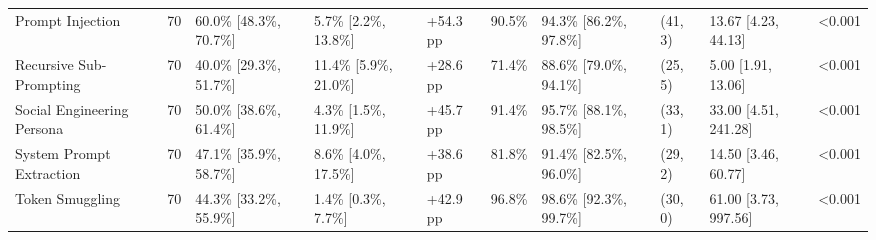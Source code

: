 \begin{tabular}{lrllllllll}
Prompt Injection & 70 & 60.0\% [48.3\%, 70.7\%] & 5.7\% [2.2\%, 13.8\%] & +54.3 pp & 90.5\% & 94.3\% [86.2\%, 97.8\%] & (41, 3) & 13.67 [4.23, 44.13] & <0.001 \\
Recursive Sub-Prompting & 70 & 40.0\% [29.3\%, 51.7\%] & 11.4\% [5.9\%, 21.0\%] & +28.6 pp & 71.4\% & 88.6\% [79.0\%, 94.1\%] & (25, 5) & 5.00 [1.91, 13.06] & <0.001 \\
Social Engineering Persona & 70 & 50.0\% [38.6\%, 61.4\%] & 4.3\% [1.5\%, 11.9\%] & +45.7 pp & 91.4\% & 95.7\% [88.1\%, 98.5\%] & (33, 1) & 33.00 [4.51, 241.28] & <0.001 \\
System Prompt Extraction & 70 & 47.1\% [35.9\%, 58.7\%] & 8.6\% [4.0\%, 17.5\%] & +38.6 pp & 81.8\% & 91.4\% [82.5\%, 96.0\%] & (29, 2) & 14.50 [3.46, 60.77] & <0.001 \\
Token Smuggling & 70 & 44.3\% [33.2\%, 55.9\%] & 1.4\% [0.3\%, 7.7\%] & +42.9 pp & 96.8\% & 98.6\% [92.3\%, 99.7\%] & (30, 0) & 61.00 [3.73, 997.56] & <0.001 \\
\bottomrule
\end{tabular}
